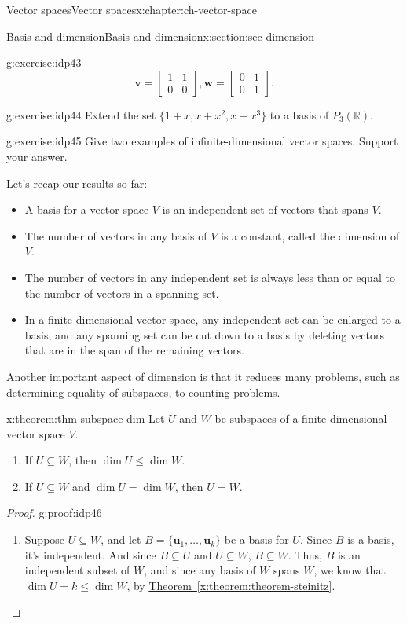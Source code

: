 \documentclass[oneside,10pt,]{book}
\newcommand{\xreffont}{\relax}
\numberwithin{equation}{section}
\newcommand{\bbm}{\begin{bmatrix}}
\newcommand{\ebm}{\end{bmatrix}}
\newcommand{\R}{\mathbb{R}}
\newcommand{\uu}{\mathbf{u}}
\newcommand{\vv}{\mathbf{v}}
\newcommand{\ww}{\mathbf{w}}
\newcommand{\amp}{&}
\begin{document}
\begin{chapterptx}{Vector spaces}{}{Vector spaces}{}{}{x:chapter:ch-vector-space}
\begin{sectionptx}{Basis and dimension}{}{Basis and dimension}{}{}{x:section:sec-dimension}
\begin{inlineexercise}{}{g:exercise:idp43}
\begin{equation*}
\vv=\bbm 1\amp 1\\0\amp 0\ebm, \ww=\bbm 0\amp 1\\0\amp 1\ebm\text{.}
\end{equation*}
%
\end{inlineexercise}%
\begin{inlineexercise}{}{g:exercise:idp44}%
Extend the set \(\{1+x,x+x^2,x-x^3\}\) to a basis of \(P_3(\R)\).%
\end{inlineexercise}%
\begin{inlineexercise}{}{g:exercise:idp45}%
Give two examples of infinite-dimensional vector spaces. Support your answer.%
\end{inlineexercise}%
Let's recap our results so far:%
\begin{itemize}[label=\textbullet]
\item{}A basis for a vector space \(V\) is an independent set of vectors that spans \(V\).%
\item{}The number of vectors in any basis of \(V\) is a constant, called the dimension of \(V\).%
\item{}The number of vectors in any independent set is always less than or equal to the number of vectors in a spanning set.%
\item{}In a finite-dimensional vector space, any independent set can be enlarged to a basis, and any spanning set can be cut down to a basis by deleting vectors that are in the span of the remaining vectors.%
\end{itemize}
Another important aspect of dimension is that it reduces many problems, such as determining equality of subspaces, to counting problems.%
\begin{theorem}{}{}{x:theorem:thm-subspace-dim}%
Let \(U\) and \(W\) be subspaces of a finite-dimensional vector space \(V\).%
\begin{enumerate}
\item{}If \(U\subseteq W\), then \(\dim U\leq \dim W\).%
\item{}If \(U\subseteq W\) and \(\dim U=\dim W\), then \(U=W\).%
\end{enumerate}
%
\end{theorem}
\begin{proof}{}{g:proof:idp46}
%
\begin{enumerate}
\item{}Suppose \(U\subseteq W\), and let \(B=\{\uu_1,\ldots, \uu_k\}\) be a basis for \(U\). Since \(B\) is a basis, it's independent. And since \(B\subseteq U\) and \(U\subseteq W\), \(B\subseteq W\). Thus, \(B\) is an independent subset of \(W\), and since any basis of \(W\) spans \(W\), we know that \(\dim U = k \leq \dim W\), by \hyperref[x:theorem:theorem-steinitz]{Theorem~{\xreffont\ref{x:theorem:theorem-steinitz}}}.%

\end{enumerate}
\end{proof}
\end{sectionptx}
\end{chapterptx}
\end{document}
